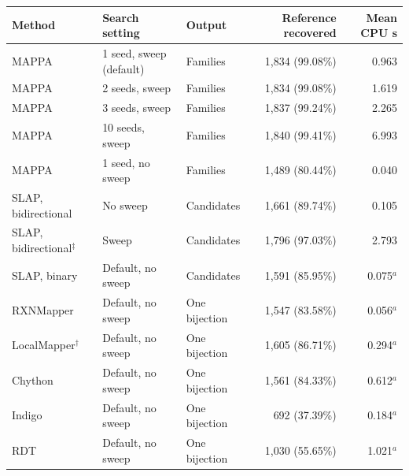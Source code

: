 \begin{tabular}{@{}lllr r@{}}\toprule
Method & Search setting & Output & Reference recovered & Mean CPU s\\\midrule
MAPPA & 1 seed, sweep (default) & Families & 1,834 (99.08\%) & 0.963 \\
MAPPA & 2 seeds, sweep & Families & 1,834 (99.08\%) & 1.619 \\
MAPPA & 3 seeds, sweep & Families & 1,837 (99.24\%) & 2.265 \\
MAPPA & 10 seeds, sweep & Families & 1,840 (99.41\%) & 6.993 \\
MAPPA & 1 seed, no sweep & Families & 1,489 (80.44\%) & 0.040 \\
SLAP, bidirectional & No sweep & Candidates & 1,661 (89.74\%) & 0.105 \\
SLAP, bidirectional$^{\ddagger}$ & Sweep & Candidates & 1,796 (97.03\%) & 2.793 \\
SLAP, binary & Default, no sweep & Candidates & 1,591 (85.95\%) & 0.075$^{a}$ \\
RXNMapper & Default, no sweep & One bijection & 1,547 (83.58\%) & 0.056$^{a}$ \\
LocalMapper$^{\dagger}$ & Default, no sweep & One bijection & 1,605 (86.71\%) & 0.294$^{a}$ \\
Chython & Default, no sweep & One bijection & 1,561 (84.33\%) & 0.612$^{a}$ \\
Indigo & Default, no sweep & One bijection & 692 (37.39\%) & 0.184$^{a}$ \\
RDT & Default, no sweep & One bijection & 1,030 (55.65\%) & 1.021$^{a}$ \\
\bottomrule\end{tabular}
